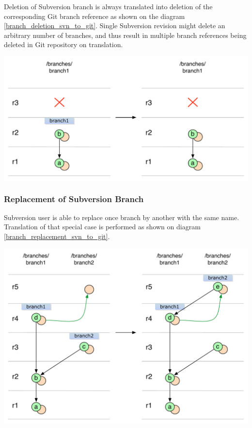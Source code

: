 Deletion of Subversion branch is always translated into deletion of the corresponding Git branch reference
as shown on the diagram \ref{branch_deletion_svn_to_git}. Single Subversion revision might delete an arbitrary number of branches, 
and thus result in multiple branch references being deleted in Git repository on translation.
\begin{center}
\includegraphics[width=\textwidth]{img/diagrams/branch_deletion_svn_to_git.pdf}%
\label{branch_deletion_svn_to_git}%
\end{center}

\subsubsection{Replacement of Subversion Branch}

Subversion user is able to replace once branch by another with the same name. 
Translation of that special case is performed as shown on diagram \ref{branch_replacement_svn_to_git}.
\begin{center}
\includegraphics[width=\textwidth]{img/diagrams/branch_replacement_svn_to_git.pdf}%
\label{branch_replacement_svn_to_git}%
\end{center}

